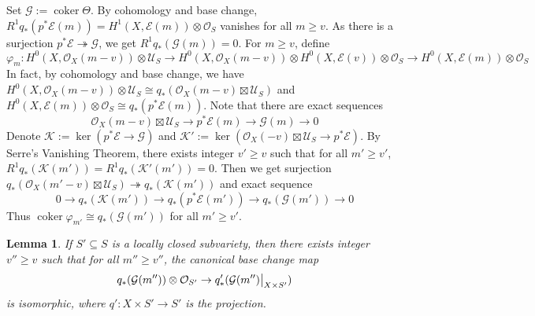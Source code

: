 \documentclass{ctexart}
\newtheorem{lemma}{Lemma}[section]
\newcommand{\coker}{\operatorname{coker}}
\begin{document}
Set $\mathcal{G} := \coker \Theta$.
By cohomology and base change, $R^{1}q_{\ast}(p^{\ast}\mathcal{E}(m)) = H^{1}(X, \mathcal{E}(m)) \otimes \mathcal{O}_{S}$ vanishes for all $m \ge v$.
As there is a surjection $p^{\ast}\mathcal{E} \twoheadrightarrow \mathcal{G}$, we get $R^{1}q_{\ast}(\mathcal{G}(m)) = 0$.
For $m \ge v$, define
\begin{equation*}
    \varphi_{m}: H^{0}(X, \mathcal{O}_{X}(m - v)) \otimes \mathcal{U}_{S} \rightarrow H^{0}(X, \mathcal{O}_{X}(m - v)) \otimes H^{0}(X, \mathcal{E}(v)) \otimes \mathcal{O}_{S} \rightarrow H^{0}(X, \mathcal{E}(m)) \otimes \mathcal{O}_{S}
\end{equation*}
In fact, by cohomology and base change, we have $H^{0}(X, \mathcal{O}_{X}(m - v)) \otimes \mathcal{U}_{S} \cong q_{\ast}(\mathcal{O}_{X}(m - v) \boxtimes \mathcal{U}_{S})$ and $H^{0}(X, \mathcal{E}(m)) \otimes \mathcal{O}_{S} \cong q_{\ast}(p^{\ast}\mathcal{E}(m))$.
Note that there are exact sequences
\begin{equation}
    \mathcal{O}_{X}(m - v) \boxtimes \mathcal{U}_{S} \rightarrow p^{\ast}\mathcal{E}(m) \rightarrow \mathcal{G}(m) \rightarrow 0
\end{equation}
Denote $\mathcal{K} := \ker (p^{\ast}\mathcal{E} \rightarrow \mathcal{G})$ and $\mathcal{K}' := \ker (\mathcal{O}_{X}(-v) \boxtimes \mathcal{U}_{S} \rightarrow p^{\ast}\mathcal{E})$.
By Serre's Vanishing Theorem, there exists integer $v' \ge v$ such that for all $m' \ge v'$,
$R^{1}q_{\ast}(\mathcal{K}(m')) = R^{1}q_{\ast}(\mathcal{K}'(m')) = 0$.
Then we get surjection $q_{\ast}(\mathcal{O}_{X}(m' - v) \boxtimes \mathcal{U}_{S}) \twoheadrightarrow q_{\ast}(\mathcal{K}(m'))$ and exact sequence
\begin{equation}
    0 \longrightarrow q_{\ast}(\mathcal{K}(m')) \longrightarrow q_{\ast}(p^{\ast}\mathcal{E}(m')) \longrightarrow q_{\ast}(\mathcal{G}(m')) \longrightarrow 0
\end{equation}
Thus $\coker \varphi_{m'} \cong q_{\ast}(\mathcal{G}(m'))$ for all $m' \ge v'$.
\begin{lemma}
    If $S' \subseteq S$ is a locally closed subvariety,
    then there exists integer $v'' \ge v$ such that for all $m'' \ge v''$, the canonical base change map
    \begin{equation}
        q_{\ast}(\mathcal{G}(m'')) \otimes \mathcal{O}_{S'} \rightarrow q'_{\ast}(\mathcal{G}(m'')\big{|}_{X \times S'})
    \end{equation}
    is isomorphic, where $q': X \times S' \rightarrow S'$ is the projection.
    \label{Lemma 7.10}
\end{lemma}
\end{document}
